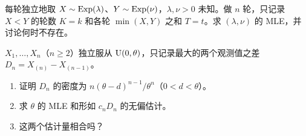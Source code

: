 \levelC
\begin{exercise}[原讲义例 2.3]
每轮独立地取 $X\sim\operatorname{Exp}(\lambda)$、$Y\sim\operatorname{Exp}(\nu)$，$\lambda,\nu>0$ 未知。做 $n$ 轮，只记录 $X<Y$ 的轮数 $K=k$ 和各轮 $\min(X,Y)$ 之和 $T=t$。求 $(\lambda,\nu)$ 的 MLE，并讨论何时不存在。
\end{exercise}

\begin{exercise}[原讲义习题 2.4]
$X_1,\dots,X_n$（$n\ge2$）独立服从 $\operatorname{U}(0,\theta)$，只记录最大的两个观测值之差 $D_n=X_{(n)}-X_{(n-1)}$。
\begin{enumerate}
\item 证明 $D_n$ 的密度为 $n(\theta-d)^{n-1}/\theta^n$（$0<d<\theta$）。
\item 求 $\theta$ 的 MLE 和形如 $c_nD_n$ 的无偏估计。
\item 这两个估计量相合吗？
\end{enumerate}
\end{exercise}
